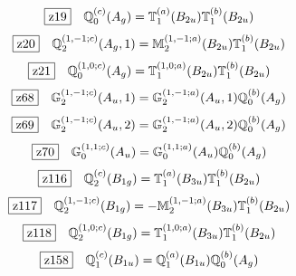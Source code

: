 \documentclass[fleqn,10pt,landscape]{jsarticle}
\begin{document}
\begin{dmath*}
\hspace*{3mm}\fbox{z19}\quad \mathbb{Q}_{0}^{(c)}(A_{g})=\mathbb{T}_{1}^{(a)}(B_{2u}) \mathbb{T}_{1}^{(b)}(B_{2u})
\end{dmath*}
\begin{dmath*}
\hspace*{3mm}\fbox{z20}\quad \mathbb{Q}_{2}^{(1,-1;c)}(A_{g},1)=\mathbb{M}_{2}^{(1,-1;a)}(B_{2u}) \mathbb{T}_{1}^{(b)}(B_{2u})
\end{dmath*}
\begin{dmath*}
\hspace*{3mm}\fbox{z21}\quad \mathbb{Q}_{0}^{(1,0;c)}(A_{g})=\mathbb{T}_{1}^{(1,0;a)}(B_{2u}) \mathbb{T}_{1}^{(b)}(B_{2u})
\end{dmath*}
\begin{dmath*}
\hspace*{3mm}\fbox{z68}\quad \mathbb{G}_{2}^{(1,-1;c)}(A_{u},1)=\mathbb{G}_{2}^{(1,-1;a)}(A_{u},1) \mathbb{Q}_{0}^{(b)}(A_{g})
\end{dmath*}
\begin{dmath*}
\hspace*{3mm}\fbox{z69}\quad \mathbb{G}_{2}^{(1,-1;c)}(A_{u},2)=\mathbb{G}_{2}^{(1,-1;a)}(A_{u},2) \mathbb{Q}_{0}^{(b)}(A_{g})
\end{dmath*}
\begin{dmath*}
\hspace*{3mm}\fbox{z70}\quad \mathbb{G}_{0}^{(1,1;c)}(A_{u})=\mathbb{G}_{0}^{(1,1;a)}(A_{u}) \mathbb{Q}_{0}^{(b)}(A_{g})
\end{dmath*}
\begin{dmath*}
\hspace*{3mm}\fbox{z116}\quad \mathbb{Q}_{2}^{(c)}(B_{1g})=\mathbb{T}_{1}^{(a)}(B_{3u}) \mathbb{T}_{1}^{(b)}(B_{2u})
\end{dmath*}
\begin{dmath*}
\hspace*{3mm}\fbox{z117}\quad \mathbb{Q}_{2}^{(1,-1;c)}(B_{1g})=- \mathbb{M}_{2}^{(1,-1;a)}(B_{3u}) \mathbb{T}_{1}^{(b)}(B_{2u})
\end{dmath*}
\begin{dmath*}
\hspace*{3mm}\fbox{z118}\quad \mathbb{Q}_{2}^{(1,0;c)}(B_{1g})=\mathbb{T}_{1}^{(1,0;a)}(B_{3u}) \mathbb{T}_{1}^{(b)}(B_{2u})
\end{dmath*}
\begin{dmath*}
\hspace*{3mm}\fbox{z158}\quad \mathbb{Q}_{1}^{(c)}(B_{1u})=\mathbb{Q}_{1}^{(a)}(B_{1u}) \mathbb{Q}_{0}^{(b)}(A_{g})
\end{dmath*}
\end{document}
